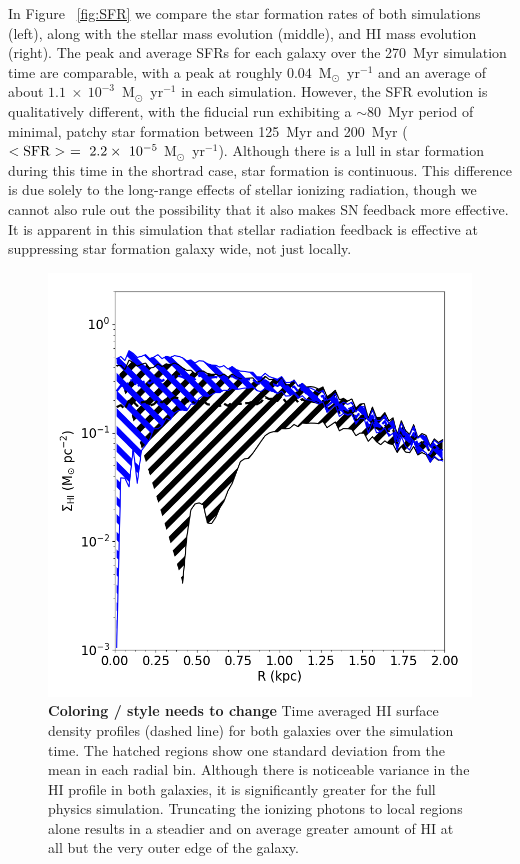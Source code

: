 \documentclass[twocolumn]{aastex61}
\begin{document}
In Figure ~\ref{fig:SFR} we compare the star formation rates of both simulations (left), along with the stellar mass evolution (middle), and HI mass evolution (right). The peak and average SFRs for each galaxy over the 270~Myr simulation time are comparable, with a peak at roughly $0.04$~M$_{\odot}$~yr$^{-1}$ and an average of about $1.1~\times~10^{-3}$~M$_{\odot}$~yr$^{-1}$ in each simulation. However, the SFR evolution is qualitatively different, with the fiducial run exhibiting a $\sim$80~Myr period of minimal, patchy star formation between 125~Myr and 200~Myr ($<\rm{SFR}>~=~2.2\times~10^{-5}~$M$_{\odot}$~yr$^{-1}$). Although there is a lull in star formation during this time in the shortrad case, star formation is continuous. This difference is due solely to the long-range effects of stellar ionizing radiation, though we cannot also rule out the possibility that it also makes SN feedback more effective. It is apparent in this simulation that stellar radiation feedback is effective at suppressing star formation galaxy wide, not just locally.

\begin{figure}
\includegraphics[width=0.9\linewidth]{HI_surface_density}
\caption{\textbf{Coloring / style needs to change} Time averaged HI surface density profiles (dashed line) for both galaxies over the simulation time. The hatched regions show one standard deviation from the mean in each radial bin. Although there is noticeable variance in the HI profile in both galaxies, it is significantly greater for the full physics simulation. Truncating the ionizing photons to local regions alone results in a steadier and on average greater amount of HI at all but the very outer edge of the galaxy.}
\label{fig:HI profile evolution}
\end{figure}
\end{document}
